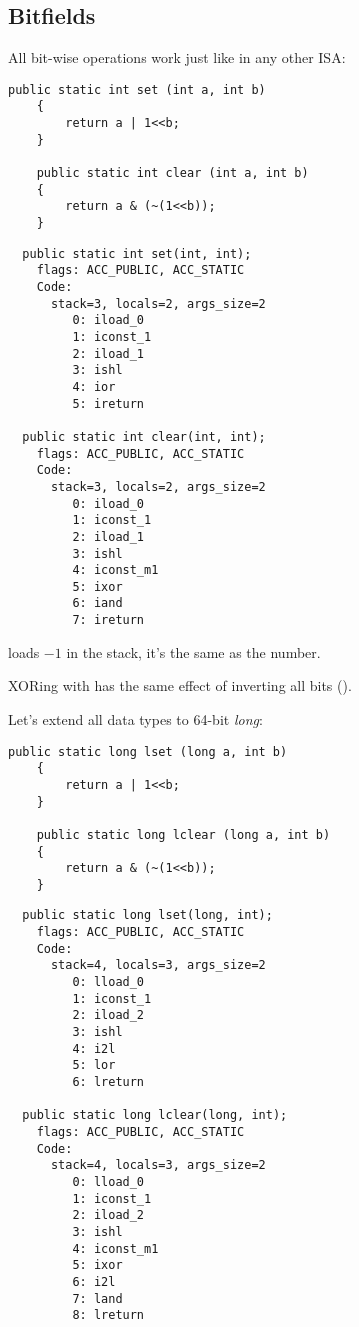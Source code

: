 \subsection{Bitfields}

All bit-wise operations work just like in any other \ac{ISA}:


\begin{lstlisting}[style=customjava]
	public static int set (int a, int b) 
	{
		return a | 1<<b;
	}

	public static int clear (int a, int b) 
	{
		return a & (~(1<<b));
	}
\end{lstlisting}

\begin{lstlisting}
  public static int set(int, int);
    flags: ACC_PUBLIC, ACC_STATIC
    Code:
      stack=3, locals=2, args_size=2
         0: iload_0       
         1: iconst_1      
         2: iload_1       
         3: ishl          
         4: ior           
         5: ireturn       

  public static int clear(int, int);
    flags: ACC_PUBLIC, ACC_STATIC
    Code:
      stack=3, locals=2, args_size=2
         0: iload_0       
         1: iconst_1      
         2: iload_1       
         3: ishl          
         4: iconst_m1     
         5: ixor          
         6: iand          
         7: ireturn       
\end{lstlisting}

 loads $-1$ in the stack, it's the same as the  number.

XORing with  has the same effect of inverting all bits
 ().

Let's extend all data types to 64-bit \emph{long}:


\begin{lstlisting}[style=customjava]
	public static long lset (long a, int b) 
	{
		return a | 1<<b;
	}

	public static long lclear (long a, int b) 
	{
		return a & (~(1<<b));
	}
\end{lstlisting}

\begin{lstlisting}
  public static long lset(long, int);
    flags: ACC_PUBLIC, ACC_STATIC
    Code:
      stack=4, locals=3, args_size=2
         0: lload_0       
         1: iconst_1      
         2: iload_2       
         3: ishl          
         4: i2l           
         5: lor           
         6: lreturn       

  public static long lclear(long, int);
    flags: ACC_PUBLIC, ACC_STATIC
    Code:
      stack=4, locals=3, args_size=2
         0: lload_0       
         1: iconst_1      
         2: iload_2       
         3: ishl          
         4: iconst_m1     
         5: ixor          
         6: i2l           
         7: land          
         8: lreturn       
\end{lstlisting}

